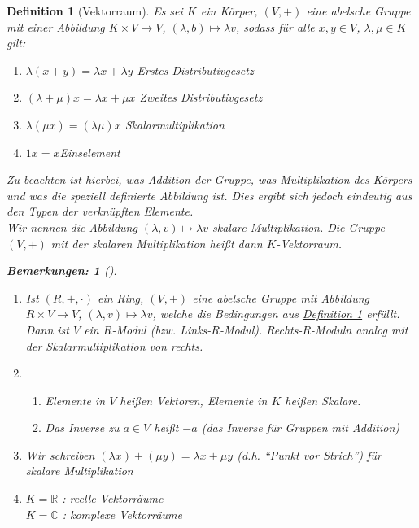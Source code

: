 \documentclass{report}
\newcommand{\IN}[1]{\index{#1|BH}}
\newcommand{\lb}{\lambda}
\newcommand{\R}{\mathbb{R}}
\newcommand{\C}{\mathbb{C}}
\theoremstyle{customrem}
\newtheorem*{bemerkung2}{Bemerkungen\textnormal:}
\newenvironment{bemerkungen}[1][]{\begin{bemerkung2}[#1]\leavevmode}{\end{bemerkung2}}
\theoremstyle{customdef}
\newtheorem{definition}{Definition}[chapter]
\begin{document}
	\begin{definition}[Vektorraum]
		\IN{Vektorraum}
		\label{def21}
		Es sei $K$ ein Körper, $(V, +)$ eine abelsche Gruppe mit einer Abbildung $K \times V \to V$, $(\lb, b) \mapsto \lb v$, sodass für alle $x, y \in V$, $\lb, \mu \in K$ gilt:
		
		\begin{enumerate}[leftmargin=3cm, rightmargin=2cm]
			\itemsep0cm
			\item $\lb (x + y) = \lb x + \lb y$ \hfill Erstes Distributivgesetz
			\item $(\lb + \mu) x = \lb x + \mu x$ \hfill Zweites Distributivgesetz
			\item $\lb (\mu x) = (\lb \mu) x$	\hfill Skalarmultiplikation
			\item $1 x = x$\hfill Einselement
		\end{enumerate}
		
		
		Zu beachten ist hierbei, was Addition der Gruppe, was Multiplikation des Körpers und was die speziell definierte Abbildung ist. Dies ergibt sich jedoch eindeutig aus den Typen der verknüpften Elemente.\\
		Wir nennen die Abbildung $(\lb, v) \mapsto \lb v$ skalare Multiplikation. Die Gruppe $(V, +)$ mit der skalaren Multiplikation  heißt dann $K$-Vektorraum.
		
		\begin{bemerkungen}
			\begin{enumerate}
				\item Ist $(R, +, \cdot)$ ein Ring, $(V, +)$ eine abelsche Gruppe mit Abbildung $R \times V \to V$, $(\lb, v) \mapsto \lb v$, welche die Bedingungen aus \hyperref[def21]{Definition \ref*{def21}} erfüllt. Dann ist $V$ ein $R$-Modul (bzw. Links-$R$-Modul).	Rechts-$R$-Moduln analog mit der Skalarmultiplikation von rechts.
				\item
				\begin{enumerate}
					\item Elemente in $V$ heißen Vektoren, Elemente in $K$ heißen Skalare.
					\item Das Inverse zu $a \in V$ heißt $-a$ (das Inverse für Gruppen mit Addition)
				\end{enumerate}
				\item Wir schreiben $(\lb x) + (\mu y) = \lb x + \mu y$ (d.h. "`Punkt vor Strich"') für skalare Multiplikation
				\item
				$K = \R$ : reelle Vektorräume\\
				$K = \C$ : komplexe Vektorräume
			\end{enumerate}
		\end{bemerkungen}
		

\end{definition}
\end{document}
